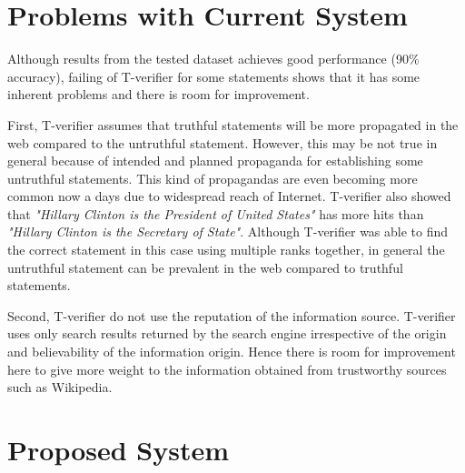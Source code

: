 \documentclass[11pt]{article}
\begin{document}

\section{Problems with Current System}
Although results from the tested dataset achieves good performance (90\%
accuracy), failing of T-verifier for some statements shows that it has some
inherent problems and there is room for improvement.

First, T-verifier assumes that truthful statements will be more propagated in the
web compared to the untruthful statement. However, this may be not true in
general because of intended and planned propaganda for establishing some
untruthful statements. This kind of propagandas are even becoming more common now
a days due to widespread reach of Internet. T-verifier also showed that \emph{"Hillary
Clinton is the President of United States"} has more hits than \emph{"Hillary Clinton is
the Secretary of State"}. Although T-verifier was able to find the correct
statement in this case using multiple ranks together, in general the untruthful
statement can be prevalent in the web compared to truthful statements.

Second, T-verifier do not use the reputation of the information source.
T-verifier uses only search results returned by the search engine irrespective of
the origin and believability of the information origin. Hence there is room for
improvement here to give more weight to the information obtained from trustworthy
sources such as Wikipedia.


\section {Proposed System}
\end{document}
